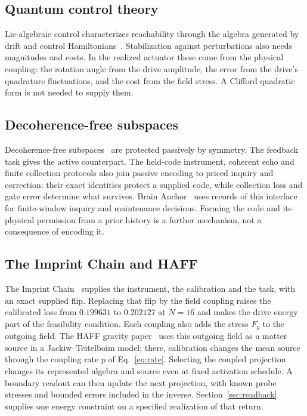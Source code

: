 \documentclass[aps,pre,onecolumn,superscriptaddress,floatfix,longbibliography]{revtex4-2}
\begin{document}
\subsection{Quantum control theory}

Lie-algebraic control characterizes reachability through the algebra generated by drift and control Hamiltonians~\cite{WisemanMilburn2009}. Stabilization against perturbations also needs magnitudes and costs. In the realized actuator these come from the physical coupling: the rotation angle from the drive amplitude, the error from the drive's quadrature fluctuations, and the cost from the field stress. A Clifford quadratic form is not needed to supply them.

\subsection{Decoherence-free subspaces}

Decoherence-free subspaces~\cite{Zanardi2001,Lidar2003} are protected passively by symmetry. The feedback task gives the active counterpart. The held-code instrument, coherent echo and finite collection protocols also join passive encoding to priced inquiry and correction: their exact identities protect a supplied code, while collection loss and gate error determine what survives. Brain Anchor~\cite{Liu2026Brain} uses records of this interface for finite-window inquiry and maintenance decisions. Forming the code and its physical permission from a prior history is a further mechanism, not a consequence of encoding it.

\subsection{The Imprint Chain and HAFF}

The Imprint Chain~\cite{Liu2026Chain} supplies the instrument, the calibration and the task, with an exact supplied flip. Replacing that flip by the field coupling raises the calibrated loss from $0.199631$ to $0.202127$ at $N=16$ and makes the drive energy part of the feasibility condition. Each coupling also adds the stress $F_g$ to the outgoing field. The HAFF gravity paper~\cite{Liu2026HAFFD} uses this outgoing field as a matter source in a Jackiw--Teitelboim model; there, calibration changes the mean source through the coupling rate $p$ of Eq.~\eqref{eq:rate}. Selecting the coupled projection changes its represented algebra and source even at fixed activation schedule. A boundary readout can then update the next projection, with known probe stresses and bounded errors included in the inverse. Section~\ref{sec:readback} supplies one energy constraint on a specified realization of that return.
\end{document}
